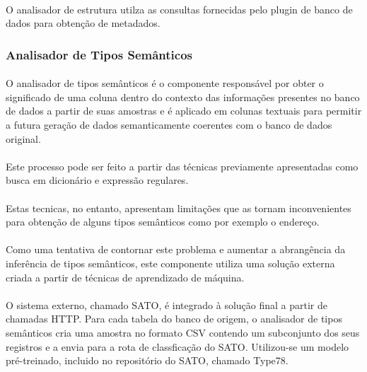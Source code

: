 \paragraph{} O analisador de estrutura utilza as consultas fornecidas pelo plugin de banco de dados para obtenção de metadados.


\subsubsection{Analisador de Tipos Semânticos}

\paragraph{} O analisador de tipos semânticos é o componente responsável por obter o significado de uma coluna dentro do contexto das informações presentes no banco de dados a partir de suas amostras e é aplicado em colunas textuais para permitir a futura geração de dados semanticamente coerentes com o banco de dados original.

\paragraph{} Este processo pode ser feito a partir das técnicas previamente apresentadas como busca em dicionário e expressão regulares.

\paragraph{} Estas tecnicas, no entanto, apresentam limitações que as tornam inconvenientes para obtenção de alguns tipos semânticos como por exemplo o endereço.

\paragraph{} Como uma tentativa de contornar este problema e aumentar a abrangência da inferência de tipos semânticos, este componente utiliza uma solução externa criada a partir de técnicas de aprendizado de máquina.

\paragraph{} O sistema externo, chamado SATO\cite{zhang2019sato}, é integrado à solução final a partir de chamadas HTTP. Para cada tabela do banco de origem, o analisador de tipos semânticos cria uma amostra no formato CSV contendo um subconjunto dos seus registros e a envia para a rota de classficação do SATO. Utilizou-se um modelo pré-treinado, incluido no repositório do SATO, chamado Type78.


